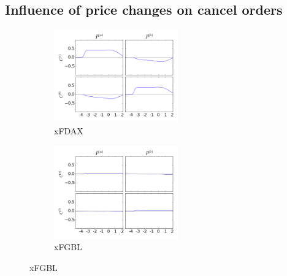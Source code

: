 \documentclass[a4paper,11pt]{article}
\begin{document}
\subsection{Influence of price changes on cancel orders}
\label{PC}
\begin{figure}[H]
        \begin{subfigure}[b]{0.45\textwidth}
                \includegraphics[width=\textwidth,height=40mm]{xFDAXPA_PB_TA_TB_LA_LB_CA_CB__PAPB-_CACBcausality.png}
                \caption{xFDAX}
        \end{subfigure}
        \begin{subfigure}[b]{0.45\textwidth}
                \includegraphics[width=\textwidth,height=40mm]{xFGBLPA_PB_TA_TB_LA_LB_CA_CB__PAPB-_CACBcausality.png}
                \caption{xFGBL}
        \end{subfigure}
\end{figure}
\end{document}
